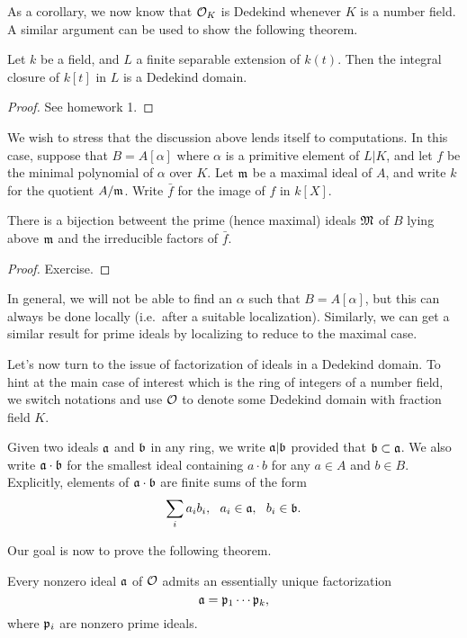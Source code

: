 As a corollary, we now know that $\mathcal{O}_{K}$ is Dedekind whenever $K$ is a number field.
A similar argument can be used to show the following theorem.
\begin{theorem}
  Let $k$ be a field, and $L$ a finite separable extension of $k(t)$.
  Then the integral closure of $k[t]$ in $L$ is a Dedekind domain.
\end{theorem}
\begin{proof}
  See homework 1.
\end{proof}

We wish to stress that the discussion above lends itself to computations.
In this case, suppose that $B = A[\alpha]$ where $\alpha$ is a primitive element of $L|K$, and let $f$ be the minimal polynomial of $\alpha$ over $K$.
Let $\mathfrak{m}$ be a maximal ideal of $A$, and write $k$ for the quotient $A/\mathfrak{m}$.
Write $\bar f$ for the image of $f$ in $k[X]$.

\begin{theorem}
  There is a bijection betweent the prime (hence maximal) ideals $\mathfrak{M}$ of $B$ lying above $\mathfrak{m}$ and the irreducible factors of $\bar f$.
\end{theorem}
\begin{proof}
  Exercise.
\end{proof}

In general, we will not be able to find an $\alpha$ such that $B = A[\alpha]$, but this can always be done locally (i.e.~after a suitable localization).
Similarly, we can get a similar result for prime ideals by localizing to reduce to the maximal case.

Let's now turn to the issue of factorization of ideals in a Dedekind domain.
To hint at the main case of interest which is the ring of integers of a number field, we switch notations and use $\mathcal{O}$ to denote some Dedekind domain with fraction field $K$.

Given two ideals $\mathfrak{a}$ and $\mathfrak{b}$ in any ring, we write $\mathfrak{a} | \mathfrak{b}$ provided that $\mathfrak{b} \subset \mathfrak{a}$.
We also write $\mathfrak{a} \cdot \mathfrak{b}$ for the smallest ideal containing $a \cdot b$ for any $a \in A$ and $b \in B$.
Explicitly, elements of $\mathfrak{a} \cdot \mathfrak{b}$ are finite sums of the form
\[ \sum_{i} a_{i} b_{i}, \ \ a_{i} \in \afrak, \ \ b_{i} \in \bfrak. \]

Our goal is now to prove the following theorem.
\begin{theorem}
  Every nonzero ideal $\mathfrak{a}$ of $\mathcal{O}$ admits an essentially unique factorization
  \[ \mathfrak{a} = \mathfrak{p}_{1} \cdots \mathfrak{p}_{k}, \]
  where $\mathfrak{p}_{i}$ are nonzero prime ideals.
\end{theorem}

